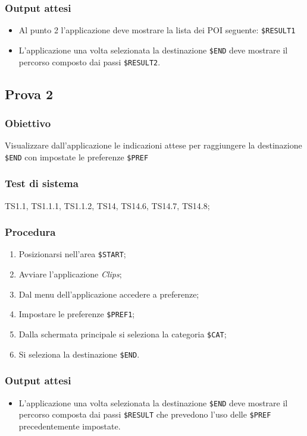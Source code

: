 \documentclass[../Sperimentazione.tex]{subfiles}
\begin{document}
	\subsubsection{Output attesi}
		\begin{itemize}
		\item Al punto 2 l'applicazione deve mostrare la lista dei POI seguente:  \verb|$RESULT1|
		\item L'applicazione una volta selezionata la destinazione  \verb|$END| deve mostrare il percorso composto dai passi  \verb|$RESULT2|.
		\end{itemize}
		
	
\newpage		
\subsection{Prova 2} %
\label{subsec:Prova2}
	
	\subsubsection{Obiettivo}
		Visualizzare dall'applicazione le indicazioni attese per raggiungere la destinazione  \verb|$END| con impostate le preferenze  \verb|$PREF|
		
	\subsubsection{Test di sistema}
		TS1.1, TS1.1.1, TS1.1.2,
		TS14, TS14.6, TS14.7, TS14.8;
		
		
	\subsubsection{Procedura}
		\begin{enumerate}
		\item Posizionarsi nell'area \verb|$START|;
		\item Avviare l'applicazione \textit{Clips};
		\item Dal menu dell'applicazione accedere a preferenze;
		\item Impostare le preferenze  \verb|$PREF1|;
		\item Dalla schermata principale si seleziona la categoria  \verb|$CAT|;
		\item Si seleziona la destinazione  \verb|$END|.
		\end{enumerate}
		
	\subsubsection{Output attesi}
		\begin{itemize}
		\item L'applicazione una volta selezionata la destinazione  \verb|$END| deve mostrare il percorso composta dai passi  \verb|$RESULT| che prevedono l'uso delle \verb|$PREF| precedentemente impostate.
		\end{itemize}
		
\end{document}
